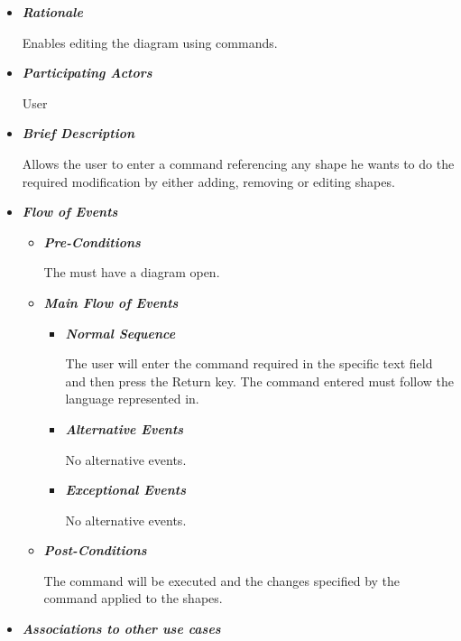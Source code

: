 \begin{itemize}

\item {\bf \em Rationale}
\par \noindent
Enables editing the diagram using commands.

\item {\bf \em Participating Actors}
\par \noindent
User

\item {\bf \em Brief Description}
\par \noindent
Allows the user to enter a command referencing any shape he wants to do the required modification by either adding, removing or editing shapes.

\item {\bf \em Flow of Events}

\begin{itemize}

\item {\bf \em Pre-Conditions}
\par \noindent
The must have a diagram open.
\item {\bf \em Main Flow of Events}

\begin{itemize}

\item {\bf \em Normal Sequence}
\par \noindent
The user will enter the command required in the specific text field and then press the Return key. The command entered must follow the language represented in.

\item {\bf \em Alternative Events}
\par \noindent
No alternative events.

\item {\bf \em Exceptional Events}
\par \noindent
No alternative events.

\end{itemize}

\item {\bf \em Post-Conditions}
\par \noindent
The command will be executed and the changes specified by the command applied to the shapes.

\end{itemize}

\item {\bf \em Associations to other use cases}


\end{itemize}
